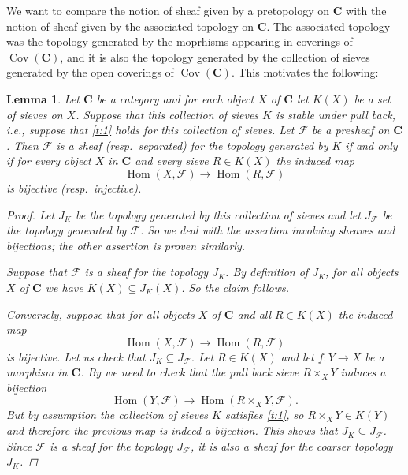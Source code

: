 \documentclass[12pt,reqno,a4paper]{amsart}
\theoremstyle{plain}
\newtheorem{lm}[thm]{Lemma}
\theoremstyle{definition}
\theoremstyle{remark}
\begin{document}
We want to compare the notion of sheaf given by a pretopology on $\mathbf{C}$ with the notion of sheaf given by the associated topology on $\mathbf{C}$.
The associated topology was the topology generated by the moprhisms appearing in coverings of $\operatorname{Cov}(\mathbf{C})$, and it is also the topology generated by the collection of sieves generated by the open coverings of $\operatorname{Cov}(\mathbf{C})$.
This motivates the following:

\begin{lm}\label{lm:generated}
  Let $\mathbf{C}$ be a category and for each object $X$ of $\mathbf{C}$ let $K(X)$ be a set of sieves on $X$.
  Suppose that this collection of sieves $K$ is stable under pull back, i.e., suppose that \ref{t:1} holds for this collection of sieves.
  Let $\mathscr{F}$ be a presheaf on $\mathbf{C}$.
  Then $\mathscr{F}$ is a sheaf (resp.~separated) for the topology generated by $K$ if and only if for every object $X$ in $\mathbf{C}$ and every sieve $R \in K(X)$ the induced map
  \[ \operatorname{Hom}(X,\mathscr{F}) \to \operatorname{Hom}(R,\mathscr{F}) \]
  is bijective (resp.~injective).
  \begin{proof}
    Let $J_{K}$ be the topology generated by this collection of sieves and let $J_{\mathscr{F}}$ be the topology generated by $\mathscr{F}$.
    So we deal with the assertion involving sheaves and bijections; the other assertion is proven similarly.

    Suppose that $\mathscr{F}$ is a sheaf for the topology $J_{K}$.
    By definition of $J_{K}$, for all objects $X$ of $\mathbf{C}$ we have $K(X) \subseteq J_{K}(X)$.
    So the claim follows.

    Conversely, suppose that for all objects $X$ of $\mathbf{C}$ and all $R \in K(X)$ the induced map
    \[ \operatorname{Hom}(X,\mathscr{F}) \to \operatorname{Hom}(R,\mathscr{F}) \]
    is bijective.
    Let us check that $J_{K} \subseteq J_{\mathscr{F}}$.
    Let $R \in K(X)$ and let $f \colon Y \to X$ be a morphism in $\mathbf{C}$.
    By  we need to check that the pull back sieve $R \times_{X} Y$ induces a bijection
    \[ \operatorname{Hom}(Y,\mathscr{F}) \to \operatorname{Hom}(R \times_{X} Y, \mathscr{F}). \]
    But by assumption the collection of sieves $K$ satisfies \ref{t:1}, so $R \times_{X} Y \in K(Y)$ and therefore the previous map is indeed a bijection.
    This shows that $J_{K} \subseteq J_{\mathscr{F}}$.
    Since $\mathscr{F}$ is a sheaf for the topology $J_{\mathscr{F}}$, it is also a sheaf for the coarser topology $J_{K}$.
  \end{proof}
\end{lm}
\end{document}
